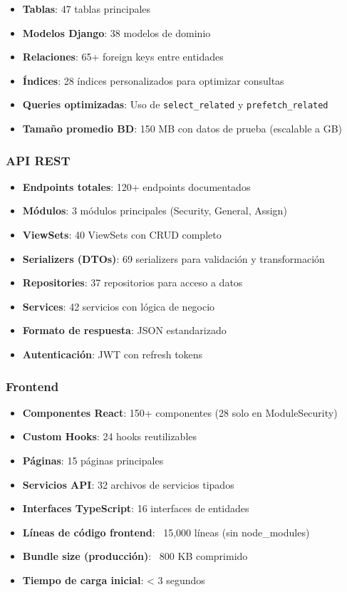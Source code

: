 \begin{itemize}
    \item \textbf{Tablas}: 47 tablas principales
    \item \textbf{Modelos Django}: 38 modelos de dominio
    \item \textbf{Relaciones}: 65+ foreign keys entre entidades
    \item \textbf{Índices}: 28 índices personalizados para optimizar consultas
    \item \textbf{Queries optimizadas}: Uso de \texttt{select\_related} y \texttt{prefetch\_related}
    \item \textbf{Tamaño promedio BD}: 150 MB con datos de prueba (escalable a GB)
\end{itemize}

\subsubsection{API REST}

\begin{itemize}
    \item \textbf{Endpoints totales}: 120+ endpoints documentados
    \item \textbf{Módulos}: 3 módulos principales (Security, General, Assign)
    \item \textbf{ViewSets}: 40 ViewSets con CRUD completo
    \item \textbf{Serializers (DTOs)}: 69 serializers para validación y transformación
    \item \textbf{Repositories}: 37 repositorios para acceso a datos
    \item \textbf{Services}: 42 servicios con lógica de negocio
    \item \textbf{Formato de respuesta}: JSON estandarizado
    \item \textbf{Autenticación}: JWT con refresh tokens
\end{itemize}

\subsubsection{Frontend}

\begin{itemize}
    \item \textbf{Componentes React}: 150+ componentes (28 solo en ModuleSecurity)
    \item \textbf{Custom Hooks}: 24 hooks reutilizables
    \item \textbf{Páginas}: 15 páginas principales
    \item \textbf{Servicios API}: 32 archivos de servicios tipados
    \item \textbf{Interfaces TypeScript}: 16 interfaces de entidades
    \item \textbf{Líneas de código frontend}: ~15,000 líneas (sin node\_modules)
    \item \textbf{Bundle size (producción)}: ~800 KB comprimido
    \item \textbf{Tiempo de carga inicial}: < 3 segundos
\end{itemize}

